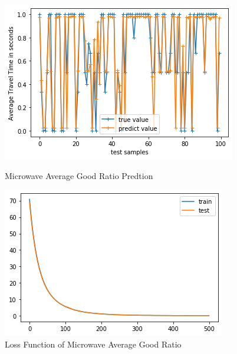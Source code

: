 \documentclass[12pt]{article}
\begin{document}
\begin{figure}[!htb]
   \begin{minipage}{0.48\textwidth}
     \centering
     \includegraphics[width=.8\linewidth]{mratio_prediction_RMSE0177.png} %
     \caption{Microwave Average Good Ratio Predtion}\label{microgr}
   \end{minipage}\hfill
   \begin{minipage}{0.48\textwidth}
     \centering
     \includegraphics[width=.8\linewidth]{mratio_loss.png}
     \caption{Loss Function of Microwave Average Good Ratio}\label{microgrloss}
   \end{minipage}
\end{figure} 
\end{document}

